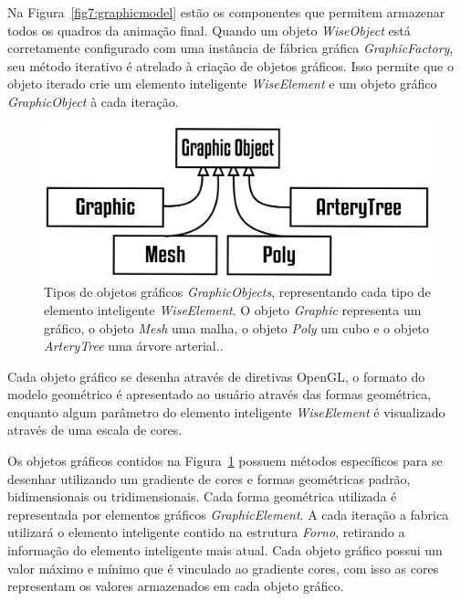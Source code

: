 Na Figura~\ref{fig7:graphicmodel} estão os componentes que permitem armazenar todos os quadros da animação final. Quando um objeto \textit{WiseObject} está corretamente configurado com uma instância de fábrica gráfica \textit{GraphicFactory}, seu método iterativo é atrelado à criação de objetos gráficos. Isso permite que o objeto iterado crie um elemento inteligente \textit{WiseElement} e um objeto gráfico \textit{GraphicObject} à cada iteração.

\begin{figure}[!htbp]
	\centering
	\includegraphics[scale=2]{Figures/GraphicObjects@16x.png}
	\caption{Tipos de objetos gráficos \textit{GraphicObjects}, representando cada tipo de elemento inteligente \textit{WiseElement}. O objeto \textit{Graphic} representa um gráfico, o objeto \textit{Mesh} uma malha, o objeto \textit{Poly} um cubo e o objeto \textit{ArteryTree} uma árvore arterial..}
	\label{fig7:graphicobjects}
\end{figure}

Cada objeto gráfico se desenha através de diretivas OpenGL, o formato do modelo geométrico é apresentado ao usuário através das formas geométrica, enquanto algum parâmetro do elemento inteligente \textit{WiseElement} é visualizado através de uma escala de cores.

Os objetos gráficos contidos na Figura~\ref{fig7:graphicobjects} possuem métodos específicos para se desenhar utilizando um gradiente de cores e formas geométricas padrão, bidimensionais ou tridimensionais. Cada forma geométrica utilizada é representada por elementos gráficos \textit{GraphicElement}. A cada iteração  a fabrica utilizará o elemento inteligente contido na estrutura \textit{Forno}, retirando a informação do elemento inteligente mais atual. Cada objeto gráfico possui um valor máximo e mínimo que é vinculado ao gradiente cores, com isso as cores representam os valores armazenados em cada objeto gráfico.

